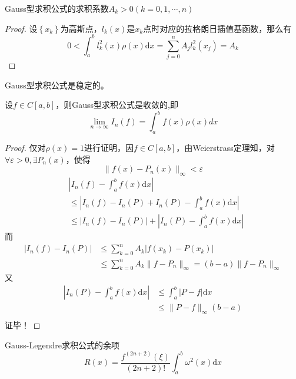 \begin{theorem}
    Gauss型求积公式的求积系数$A_{k}> 0(k = 0,1,\cdots,n)$
\end{theorem}
\begin{proof}
    设$\left\{ x_k \right\}$为高斯点，$l_{k}(x)$是$x_k$点时对应的拉格朗日插值基函数，那么有
    \[
        0<\int_{a}^bl_{k}^{2}(x)\rho(x)\mathrm{d}x = \sum\limits_{j =0}^{n}A_{j}l_{k}^{2}(x_j) = A_{k}
    \]
\end{proof}
\begin{corollary}
    Gauss型求积公式是稳定的。
\end{corollary}
\begin{theorem}
    设$f\in C[a,b]$，则Gauss型求积公式是收敛的,即
    \[
        \lim_{n\to\infty}I_n(f)=\int_a^bf(x)\rho(x)dx
    \]
\end{theorem}
\begin{proof}
    仅对$\rho(x) = 1$进行证明，因$f\in C[a,b]$，由Weierstrass定理知，对$\forall \varepsilon>0,\exists P_{n}(x)$，使得
    \[
        \| f(x)-P_{n}(x) \|_{\infty}<\varepsilon
    \]
    \[
        \begin{aligned}
            &\left|I_{n}(f)-\int_{a}^{b}f(x)\mathrm{d}x\right|\\
            &\leqslant\left| I_{n}(f)-I_{n}(P)+I_{n}(P)-\int_{a}^{b}f(x)\mathrm{d}x \right|\\
            &\leqslant \left| I_{n}(f)-I_{n}(P) \right|+\left|I_{n}(P)-\int_{a}^{b}f(x)\mathrm{d}x\right|
        \end{aligned}
    \]
    而
    \[
        \begin{aligned}
            \left| I_{n}(f)-I_{n}(P) \right| &\leqslant \sum_{k = 0}^{n}A_k\left|f(x_{k})-P(x_k)\right|\\
            &\leqslant \sum_{k = 0}^{n}A_{k}\| f-P_{n} \|_{\infty}=(b-a)\| f-P_{n} \|_{\infty}
        \end{aligned}
    \]
    又
    \[
        \begin{aligned}
            \left|I_{n}(P)-\int_{a}^{b}f(x)\mathrm{d}x\right|&\leqslant \int_{a}^b \left| P-f \right|\mathrm{d}x\\
            & \leqslant \| P-f \|_{\infty}(b-a)\\
        \end{aligned}
    \]
    证毕！
\end{proof}
\begin{theorem}
    Gauss-Legendre求积公式的余项
    \[
        R(x)=\frac{f^{(2n+2)}(\xi)}{(2n+2)!}\int_a^b\omega^2(x)\mathrm{d}x
    \]
\end{theorem}
